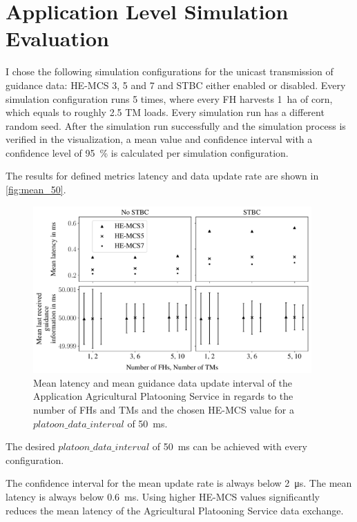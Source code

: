 \section{Application Level Simulation Evaluation}
I chose the following simulation configurations for the unicast transmission of guidance data: \ac{HE}-\ac{MCS} 3, 5 and 7 and
\ac{STBC} either enabled or disabled.
Every simulation configuration runs \num{5} times, where every \ac{FH} harvests \SI{1}{\hectare} of corn, which equals to roughly
\num{2.5} \ac{TM} loads.
Every simulation run has a different random seed.
After the simulation run successfully and the simulation process is verified in the visualization,
a mean value and confidence interval with a confidence level of
\SI{95}{\percent} is calculated per simulation configuration.

The results for defined metrics latency and data update rate are shown in \autoref{fig:mean_50}.


\begin{figure}[]%
	\centering
	\includegraphics[width=0.95\textwidth]{figures/latency_lastUpdate50ms}
	\caption{Mean latency and mean guidance data update interval of the Application Agricultural Platooning Service
	in regards to the number of \acfp{FH} and \acfp{TM} and
	the chosen \ac{HE}-\ac{MCS} value for a $platoon\_data\_interval$ of \SI{50}{\milli\second}.}
	\label{fig:mean_50}%
\end{figure}

The desired $platoon\_data\_interval$ of \SI{50}{\milli\second} can be achieved with every
configuration.

The confidence interval for the mean update rate is always below \SI{2}{\micro\second}.
The mean latency is always below \SI{0.6}{\milli\second}.
Using higher \ac{HE}-\ac{MCS} values significantly reduces the mean latency of
the Agricultural Platooning Service data exchange.

